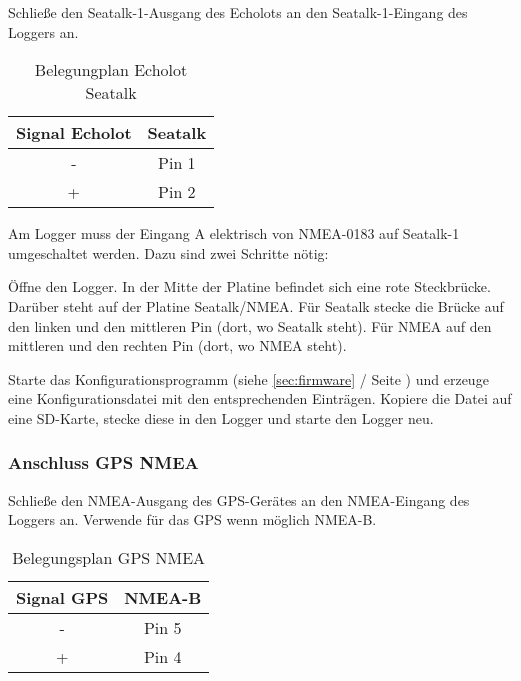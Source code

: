 \documentclass[pdftex, 8pt, paper=130mm:92mm,pagesize]{scrartcl}
\begin{document}
Schließe den Seatalk-1-Ausgang des Echolots an den Seatalk-1-Eingang des Loggers an. 

\begin{table}[H]
\centering
{}
\begin{tabular}{cc} \toprule
Signal Echolot & Seatalk\\ \midrule
- & Pin 1\\
+ & Pin 2\\ \bottomrule
\end{tabular}	
\caption{Belegungplan Echolot Seatalk}
\end{table}

Am Logger muss der Eingang A elektrisch von NMEA-0183 auf Seatalk-1 umgeschaltet werden. Dazu sind zwei Schritte nötig:

\begin{compactenum}
 \item Öffne den Logger. In der Mitte der Platine befindet sich eine rote Steckbrücke. Darüber steht auf der Platine \glqq Seatalk/NMEA\grqq{}. Für Seatalk stecke die Brücke auf den linken und den mittleren Pin (dort, wo \glqq Seatalk\grqq{} steht). Für NMEA auf den mittleren und den rechten Pin (dort, wo \glqq NMEA\grqq{} steht). 

\item Starte das Konfigurationsprogramm (siehe \ref{sec:firmware}  / Seite \pageref{sec:firmware}) und erzeuge eine Konfigurationsdatei mit den entsprechenden Einträgen. Kopiere die Datei auf eine SD-Karte, stecke diese in den Logger und starte den Logger neu. 
\end{compactenum}

\subsubsection{Anschluss GPS NMEA}

Schließe den NMEA-Ausgang des GPS-Gerätes an den NMEA-Eingang des Loggers an. Verwende für das GPS wenn möglich NMEA-B. 

\begin{table}[H]
\centering
{}
\begin{tabular}{cc} \toprule
Signal GPS & NMEA-B\\ \midrule
- & Pin 5\\
+ & Pin 4\\ \bottomrule
\end{tabular}	
\caption{Belegungsplan GPS NMEA}
\end{table}
\end{document}

